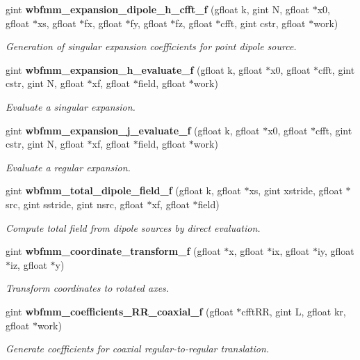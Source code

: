 \begin{DoxyCompactItemize}
gint \textbf{ wbfmm\+\_\+expansion\+\_\+dipole\+\_\+h\+\_\+cfft\+\_\+f} (gfloat k, gint N, gfloat $\ast$x0, gfloat $\ast$xs, gfloat $\ast$fx, gfloat $\ast$fy, gfloat $\ast$fz, gfloat $\ast$cfft, gint cstr, gfloat $\ast$work)
\begin{DoxyCompactList}\small\item\em Generation of singular expansion coefficients for point dipole source. \end{DoxyCompactList}\item 
gint \textbf{ wbfmm\+\_\+expansion\+\_\+h\+\_\+evaluate\+\_\+f} (gfloat k, gfloat $\ast$x0, gfloat $\ast$cfft, gint cstr, gint N, gfloat $\ast$xf, gfloat $\ast$field, gfloat $\ast$work)
\begin{DoxyCompactList}\small\item\em Evaluate a singular expansion. \end{DoxyCompactList}\item 
gint \textbf{ wbfmm\+\_\+expansion\+\_\+j\+\_\+evaluate\+\_\+f} (gfloat k, gfloat $\ast$x0, gfloat $\ast$cfft, gint cstr, gint N, gfloat $\ast$xf, gfloat $\ast$field, gfloat $\ast$work)
\begin{DoxyCompactList}\small\item\em Evaluate a regular expansion. \end{DoxyCompactList}\item 
gint \textbf{ wbfmm\+\_\+total\+\_\+dipole\+\_\+field\+\_\+f} (gfloat k, gfloat $\ast$xs, gint xstride, gfloat $\ast$src, gint sstride, gint nsrc, gfloat $\ast$xf, gfloat $\ast$field)
\begin{DoxyCompactList}\small\item\em Compute total field from dipole sources by direct evaluation. \end{DoxyCompactList}\item 
gint \textbf{ wbfmm\+\_\+coordinate\+\_\+transform\+\_\+f} (gfloat $\ast$x, gfloat $\ast$ix, gfloat $\ast$iy, gfloat $\ast$iz, gfloat $\ast$y)
\begin{DoxyCompactList}\small\item\em Transform coordinates to rotated axes. \end{DoxyCompactList}\item 
gint \textbf{ wbfmm\+\_\+coefficients\+\_\+\+R\+R\+\_\+coaxial\+\_\+f} (gfloat $\ast$cfft\+RR, gint L, gfloat kr, gfloat $\ast$work)
\begin{DoxyCompactList}\small\item\em Generate coefficients for coaxial regular-\/to-\/regular translation. \end{DoxyCompactList}\item 

\end{DoxyCompactItemize}
